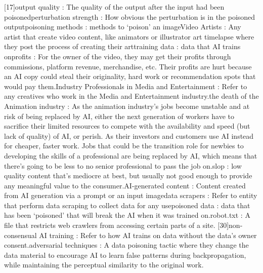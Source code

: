 [17]output quality : The quality of the output after the input had been poisoned\newline
[18]perturbation strength : How obvious the perturbation is in the poisoned output\newline
[19]poisoning methods : methods to ‘poison’ an image\newline
[20]Video Artists : Any artist that create video content, like animators or illustrator art timelapse where they post the process of creating their art\newline
[21]training data : data that AI trains on\newline
[22]profits : For the owner of the video, they may get their profits through commissions, platform revenue, merchandise, etc. Their profits are hurt because an AI copy could steal their originality, hard work or recommendation spots that would pay them.\newline
[23]Industry Professionals in Media and Entertainment : Refer to any creatives who work in the Media and Entertainment industry.\newline
[24]the death of the Animation industry : As the animation industry’s jobs become unstable and at risk of being replaced by AI, either the next generation of workers have to sacrifice their limited resources to compete with the availability and speed (but lack of quality) of AI, or perish. As their investors and customers use AI instead for cheaper, faster work. Jobs that could be the transition role for newbies to developing the skills of a professional are being replaced by AI, which means that there’s going to be less to no senior professional to pass the job on.\newline
[25]slop : low quality content that’s mediocre at best, but usually not good enough to provide any meaningful value to the consumer.\newline
[26]AI-generated content : Content created from AI generation via a prompt or an input image\newline
[27]data scrapers : Refer to entity that perform data scraping to collect data for any use\newline
[28]poisoned data : data that has been ‘poisoned’ that will break the AI when it was trained on.\newline
[29]robot.txt :  A file that restricts web crawlers from accessing certain parts of a site.
[30]non-consensual AI training : Refer to how AI trains on data without the data’s owner consent.\newline
[31]adversarial techniques : A data poisoning tactic where they change the data material to encourage AI to learn false patterns during backpropagation, while maintaining the perceptual similarity to the original work.\newline

